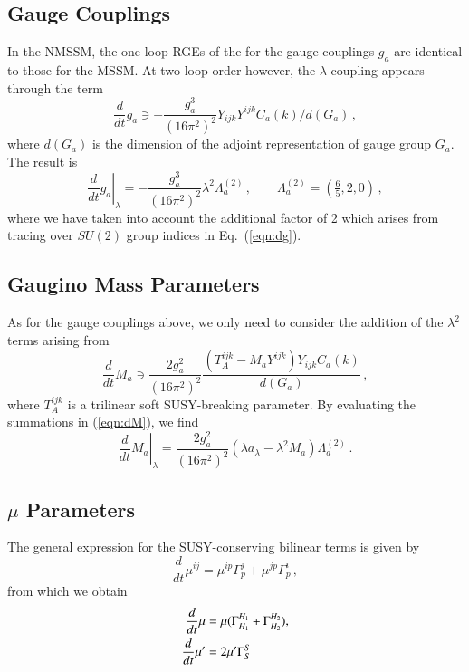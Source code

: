 \documentclass[final,3p,times,pdflatex]{elsarticle}
\newcommand{\lamsq}{\lambda^2}
\newcommand{\dt}{\frac{d}{dt}}
\begin{document}
\subsection{Gauge Couplings}
In the NMSSM, the one-loop RGEs of the for the gauge couplings $g_a$ are 
identical to those for the MSSM.  At two-loop order however, the $\lambda$ 
coupling appears through the term
%
\begin{equation}
\dt g_a \ni - \frac{g_a^3}{(16\pi^2)^2} Y_{ijk}Y^{ijk} C_a(k)/d(G_a)\,,  
\label{eqn:dg}
\end{equation}
%
where $d(G_a)$ is the dimension of the adjoint representation of gauge group 
$G_a$.  The result is
%
\begin{equation}
\left. \dt g_a\right|_\lambda = -\frac{g_a^3}{(16\pi^2)^2}\lamsq \Lambda_a^{(2)}\,,
\qquad \Lambda_a^{(2)} = (\tfrac{6}{5},2,0)\,,
\end{equation}
%
where we have taken into account the additional factor of 2 which arises from 
tracing over $SU(2)$ group indices in Eq.~(\ref{eqn:dg}).

\subsection{Gaugino Mass Parameters}
As for the gauge couplings above, we only need to consider the addition of the 
$\lambda^2$ terms arising from
%
\begin{equation}
\dt M_a \ni \frac{2g_a^2}{(16\pi^2)^2} 
\frac{(T_A^{ijk} - M_a Y^{ijk}) Y_{ijk}C_a(k)}{d(G_a)}\,,
\label{eqn:dM}
\end{equation}
%
where $T_A^{ijk}$ is a trilinear soft SUSY-breaking parameter. By evaluating the summations in (\ref{eqn:dM}), we find
%
\begin{equation}
\left. \dt M_a\right|_{\lambda} = \frac{2g_a^2}{(16\pi^2)^2} (\lambda a_\lambda - \lambda^2 M_a)\Lambda^{(2)}_a\,.
\end{equation}

\subsection{$\mu$ Parameters}
The general expression \cite{MV94,Yam94} for the SUSY-conserving bilinear terms is given by  
%
\begin{equation}
\dt \mu^{ij} = \mu^{ip}\Gamma_p^j + \mu^{jp}\Gamma_p^i\,,
\end{equation}
%
from which we obtain
%
\begin{align}
\dt\mu &= \mu (\Gamma_{H_1}^{H_1} + \Gamma_{H_2}^{H_2}), \notag \\
%
\dt\mu' &= 2\mu' \Gamma_S^S
\end{align}
%
\end{document}
